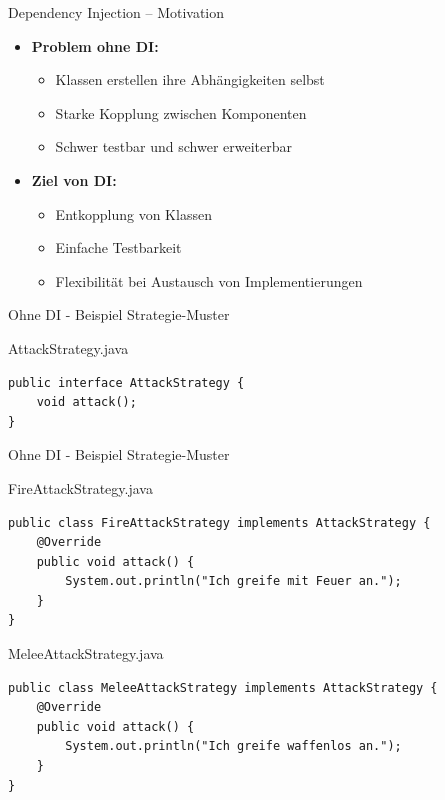 \begin{frame}{Dependency Injection – Motivation}
	\begin{itemize}
	    \item \textbf{Problem ohne DI:} 
	    \begin{itemize}
	        \item Klassen erstellen ihre Abhängigkeiten selbst
	        \item Starke Kopplung zwischen Komponenten
	        \item Schwer testbar und schwer erweiterbar
	    \end{itemize}
	    \item \textbf{Ziel von DI:}
	    \begin{itemize}
	        \item Entkopplung von Klassen
	        \item Einfache Testbarkeit
	        \item Flexibilität bei Austausch von Implementierungen
	    \end{itemize}
	\end{itemize}
\end{frame}

\begin{frame}[fragile]{Ohne DI - Beispiel Strategie-Muster}
	\begin{exampleblock}{AttackStrategy.java}
		\begin{lstlisting}
public interface AttackStrategy {
	void attack();
}	
		\end{lstlisting}	
	\end{exampleblock}
\end{frame}

\begin{frame}[fragile]{Ohne DI - Beispiel Strategie-Muster}
	\begin{exampleblock}{FireAttackStrategy.java}
		\begin{lstlisting}
public class FireAttackStrategy implements AttackStrategy {
	@Override
	public void attack() {
		System.out.println("Ich greife mit Feuer an.");
	}
}
		\end{lstlisting}	
	\end{exampleblock}
	
	\begin{exampleblock}{MeleeAttackStrategy.java}
		\begin{lstlisting}
public class MeleeAttackStrategy implements AttackStrategy {
	@Override
	public void attack() {
		System.out.println("Ich greife waffenlos an.");
	}
}
		\end{lstlisting}	
	\end{exampleblock}	
\end{frame}

